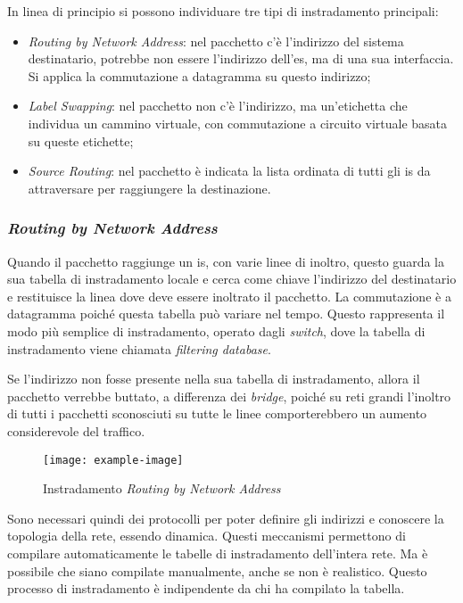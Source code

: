 \documentclass{article}
\numberwithin{equation}{subsection}
\begin{document}
In linea di principio si possono individuare tre tipi di instradamento principali:
\begin{itemize}
    \item \textit{Routing by Network Address}: nel pacchetto c'è l'indirizzo del sistema destinatario, potrebbe non essere l'indirizzo dell'\textcolor{Periwinkle}{es}, ma di una sua interfaccia. Si applica la commutazione a datagramma su questo indirizzo;
    \item \textit{Label Swapping}: nel pacchetto non c'è l'indirizzo, ma un'etichetta che individua un cammino virtuale, con commutazione a circuito virtuale basata su queste etichette;
    \item \textit{Source Routing}: nel pacchetto è indicata la lista ordinata di tutti gli \textcolor{Emerald}{is} da attraversare per raggiungere la destinazione. 
\end{itemize}

\subsubsection{\textit{Routing by Network Address}}

Quando il pacchetto raggiunge un \textcolor{Emerald}{is}, con varie linee di inoltro, questo guarda la sua tabella di instradamento locale e cerca come chiave l'indirizzo del 
destinatario e restituisce la linea dove deve essere inoltrato il pacchetto. La commutazione è a datagramma poiché questa tabella può variare nel tempo. Questo 
rappresenta il modo più semplice di instradamento, operato dagli \textit{switch}, dove la tabella di instradamento viene chiamata \textit{filtering \textit{database}}. 

Se l'indirizzo non fosse presente nella sua tabella di instradamento, allora il pacchetto verrebbe buttato, a differenza dei \textit{bridge}, poiché su reti grandi l'inoltro di 
tutti i pacchetti sconosciuti su tutte le linee comporterebbero un aumento considerevole del traffico. 

\begin{figure}[H]%
    \centering%
    \texttt{[image: example-image]}%
    \caption{Instradamento \textit{Routing by Network Address}}%
\end{figure}

Sono necessari quindi dei protocolli per poter definire gli indirizzi e conoscere la topologia della rete, essendo dinamica. Questi meccanismi permettono di 
compilare automaticamente le tabelle di instradamento dell'intera rete. Ma è possibile che siano compilate manualmente, anche se non è realistico. Questo processo 
di instradamento è indipendente da chi ha compilato la tabella. 
\end{document}
